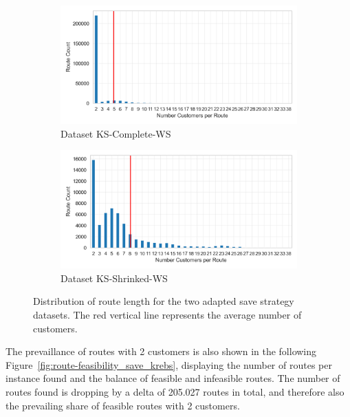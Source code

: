 \begin{figure}[ht]
    \centering
    \begin{subfigure}[t]{.5\textwidth}
        \centering
        \includegraphics[width=\linewidth]{pictures/dataset_structure/no_cust_plot_krebs_28880_600_WS.png}
        \caption{Dataset KS-Complete-WS}
        \label{fig:ds-a-krebs}
    \end{subfigure}%
    \begin{subfigure}[t]{.5\textwidth}
        \centering
        \includegraphics[width=\linewidth]{pictures/dataset_structure/no_cust_plot_krebs_28880_600_WS_shrinked094.png}
        \caption{Dataset KS-Shrinked-WS}
        \label{fig:ds-b-krebs}
    \end{subfigure}
    \caption{Distribution of route length for the two adapted save strategy datasets. The red vertical line represents the average
        number of customers.}
    \label{fig:route-dists_save_krebs}
\end{figure}

The prevaillance of routes with 2 customers is also shown in the following Figure~\ref{fig:route-feasibility_save_krebs}, displaying the number of routes per instance found and
the balance of feasible and infeasible routes. The number of routes found is dropping by a delta of 205.027 routes in total, and therefore
also the prevailing share of feasible routes with 2 customers.

